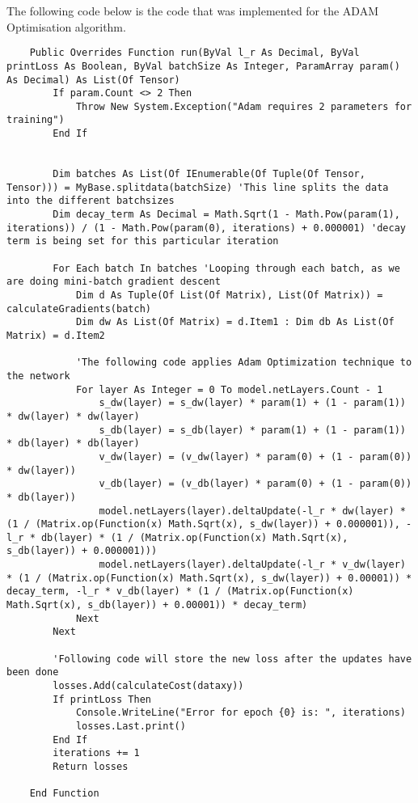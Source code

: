 The following code below is the code that was implemented for the ADAM Optimisation algorithm.
\begin{verbatim}
    Public Overrides Function run(ByVal l_r As Decimal, ByVal printLoss As Boolean, ByVal batchSize As Integer, ParamArray param() As Decimal) As List(Of Tensor)
        If param.Count <> 2 Then
            Throw New System.Exception("Adam requires 2 parameters for training")
        End If


        Dim batches As List(Of IEnumerable(Of Tuple(Of Tensor, Tensor))) = MyBase.splitdata(batchSize) 'This line splits the data into the different batchsizes
        Dim decay_term As Decimal = Math.Sqrt(1 - Math.Pow(param(1), iterations)) / (1 - Math.Pow(param(0), iterations) + 0.000001) 'decay term is being set for this particular iteration

        For Each batch In batches 'Looping through each batch, as we are doing mini-batch gradient descent
            Dim d As Tuple(Of List(Of Matrix), List(Of Matrix)) = calculateGradients(batch)
            Dim dw As List(Of Matrix) = d.Item1 : Dim db As List(Of Matrix) = d.Item2

            'The following code applies Adam Optimization technique to the network
            For layer As Integer = 0 To model.netLayers.Count - 1
                s_dw(layer) = s_dw(layer) * param(1) + (1 - param(1)) * dw(layer) * dw(layer)
                s_db(layer) = s_db(layer) * param(1) + (1 - param(1)) * db(layer) * db(layer)
                v_dw(layer) = (v_dw(layer) * param(0) + (1 - param(0)) * dw(layer))
                v_db(layer) = (v_db(layer) * param(0) + (1 - param(0)) * db(layer))
                model.netLayers(layer).deltaUpdate(-l_r * dw(layer) * (1 / (Matrix.op(Function(x) Math.Sqrt(x), s_dw(layer)) + 0.000001)), -l_r * db(layer) * (1 / (Matrix.op(Function(x) Math.Sqrt(x), s_db(layer)) + 0.000001)))
                model.netLayers(layer).deltaUpdate(-l_r * v_dw(layer) * (1 / (Matrix.op(Function(x) Math.Sqrt(x), s_dw(layer)) + 0.00001)) * decay_term, -l_r * v_db(layer) * (1 / (Matrix.op(Function(x) Math.Sqrt(x), s_db(layer)) + 0.00001)) * decay_term)
            Next
        Next

        'Following code will store the new loss after the updates have been done
        losses.Add(calculateCost(dataxy))
        If printLoss Then
            Console.WriteLine("Error for epoch {0} is: ", iterations)
            losses.Last.print()
        End If
        iterations += 1
        Return losses

    End Function
\end{verbatim}